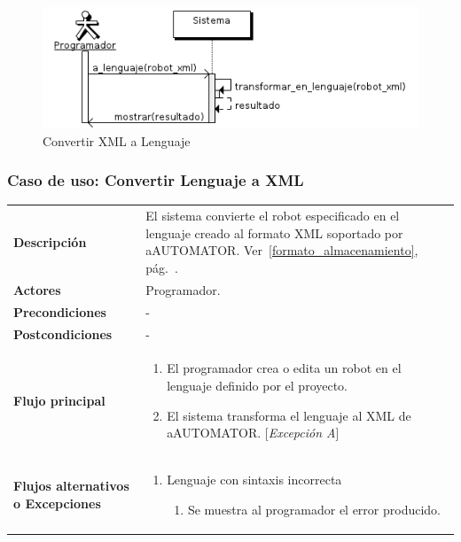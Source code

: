 \begin{figure}[bp!]
  \includegraphics[width=1\textwidth]{chapters/technical-manual/diagrams/sequence/convertir_xml_a_lenguaje.png}
\caption{Convertir XML a Lenguaje}
\end{figure}
\clearpage

\subsubsection{\large{Caso de uso: Convertir Lenguaje a XML}}
\label{convertir_lenguaje_a_xml_caso_uso}
\begin{tabular}[h]{ p{ } p{ }}

\textbf{Descripción} & El sistema convierte el robot especificado en
el lenguaje creado al formato XML soportado por
aAUTOMATOR. Ver~\ref{formato_almacenamiento},
pág.~\pageref{formato_almacenamiento}. \\[3mm]

\textbf{Actores} & Programador.\\[3mm]

\textbf{Precondiciones} & - \\[3mm]

\textbf{Postcondiciones} & - \\[3mm]

\textbf{Flujo principal} & \begin{enumerate}[leftmargin=1em,topsep=0pt, partopsep=0pt]
  \item El programador crea o edita un robot en el lenguaje definido
    por el proyecto.
  \item El sistema transforma el lenguaje al XML de
    aAUTOMATOR. [\emph{Excepción A}]
\end{enumerate}\\[3mm]

\textbf{Flujos alternativos o Excepciones} &
\begin{enumerate}[label=\Alph*:,leftmargin=1em,topsep=0pt,
    partopsep=0pt]
\item Lenguaje con sintaxis incorrecta
  \begin{enumerate}[label=\arabic*.,topsep=0pt, partopsep=0pt]
    \item Se muestra al programador el error producido.
  \end{enumerate}
\end{enumerate}\\[3mm]
\end{tabular}

